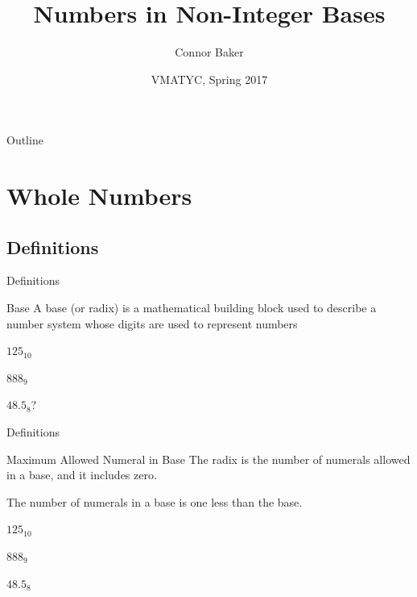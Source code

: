 \documentclass{beamer}
\title{Numbers in Non-Integer Bases}
\author{Connor Baker}
\institute{Northern Virginia Community College} %
\date{VMATYC, Spring 2017}
\begin{document}
\begin{frame}
  \titlepage
\end{frame}

\begin{frame}{Outline}
  \tableofcontents
\end{frame}


\section{Whole Numbers}










\subsection{Definitions}
\begin{frame}{Definitions}
  \begin{block}{Base}
    A base (or radix) is a mathematical building block used to describe a number system whose digits are used to represent numbers
  \end{block}\pause

  \begin{example}
    $125_{10}$\pause

    $888_9$\pause

    $48.5_8$\pause ?
  \end{example}
\end{frame}

\begin{frame}{Definitions}
  \begin{block}{Maximum Allowed Numeral in Base}
    The radix is the number of numerals allowed in a base, and it includes zero. \pause

    The number of numerals in a base is one less than the base.
  \end{block}\pause

  \begin{example}
    $125_{10}$

    $888_9$

    $48.5_8$
  \end{example}
\end{frame}
\end{document}
